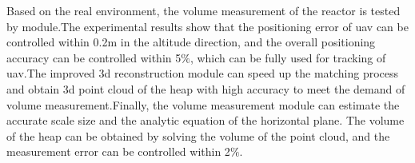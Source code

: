 \begin{eabstract}
  Based on the real environment, the volume measurement of the reactor is tested by module.The experimental results show that the positioning error of uav can be controlled within 0.2m in the altitude direction, and the overall positioning accuracy can be controlled within 5$\%$, which can be fully used for tracking of uav.The improved 3d reconstruction module can speed up the matching process and obtain 3d point cloud of the heap with high accuracy to meet the demand of volume measurement.Finally, the volume measurement module can estimate the accurate scale size and the analytic equation of the horizontal plane. The volume of the heap can be obtained by solving the volume of the point cloud, and the measurement error can be controlled within 2$\%$.
\end{eabstract}

